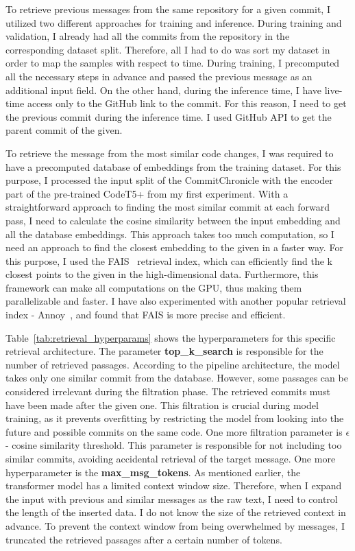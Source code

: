 To retrieve previous messages from the same repository for a given commit, I utilized two different approaches for training and inference. During training and validation, I already had all the commits from the repository in the corresponding dataset split. Therefore, all I had to do was sort my dataset in order to map the samples with respect to time. During training, I precomputed all the necessary steps in advance and passed the previous message as an additional input field. On the other hand, during the inference time, I have live-time access only to the GitHub link to the commit. For this reason, I need to get the previous commit during the inference time. I used GitHub API to get the parent commit of the given.

To retrieve the message from the most similar code changes, I was required to have a precomputed database of embeddings from the training dataset. For this purpose, I processed the input split of the CommitChronicle with the encoder part of the pre-trained CodeT5+ from my first experiment. With a straightforward approach to finding the most similar commit at each forward pass, I need to calculate the cosine similarity between the input embedding and all the database embeddings.   This approach takes too much computation, so I need an approach to find the closest embedding to the given in a faster way. For this purpose, I used the FAIS~\cite{johnson2019billion} retrieval index, which can efficiently find the k closest points to the given in the high-dimensional data. Furthermore, this framework can make all computations on the GPU, thus making them parallelizable and faster. I have also experimented with another popular retrieval index - Annoy~\cite{annoy}, and found that FAIS is more precise and efficient.

Table~\ref{tab:retrieval_hyperparams} shows the hyperparameters for this specific retrieval architecture. The parameter \textbf{top\_k\_search} is responsible for the number of retrieved passages. According to the pipeline architecture, the model takes only one similar commit from the database. However, some passages can be considered irrelevant during the filtration phase. The retrieved commits must have been made after the given one. This filtration is crucial during model training, as it prevents overfitting by restricting the model from looking into the future and possible commits on the same code. One more filtration parameter is $\epsilon$ - cosine similarity threshold. This parameter is responsible for not including too similar commits, avoiding accidental retrieval of the target message. One more hyperparameter is the \textbf{max\_msg\_tokens}. As mentioned earlier, the transformer model has a limited context window size. Therefore, when I expand the input with previous and similar messages as the raw text, I need to control the length of the inserted data. I do not know the size of the retrieved context in advance. To prevent the context window from being overwhelmed by messages, I truncated the retrieved passages after a certain number of tokens.

